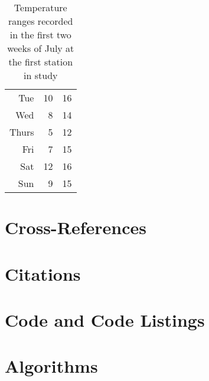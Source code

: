 \begin{table}
\begin{subtable}[h]{0.325\textwidth}
\begin{tabular}{r r r}
                Tue   & 10 & 16 \\
                Wed   & 8  & 14 \\
                Thurs & 5  & 12 \\
                Fri   & 7  & 15 \\
                Sat   & 12 & 16 \\
                Sun   & 9  & 15 \\
                \hline
            \end{tabular}
        \end{subtable}
        \caption{Temperature ranges recorded in the first two weeks of July at the first station in study}
        \label{tab:temps}
    \end{table}

\section{Cross-References} \label{sec:Cross_References}
\lipsum[1-2]

\section{Citations} \label{sec:Citations}
\lipsum[1-2]

\section{Code and Code Listings} \label{sec:Code_and_Code_Listings}
\lipsum[1-2]

\section{Algorithms} \label{sec:Algorithms}
\lipsum[1-2]
